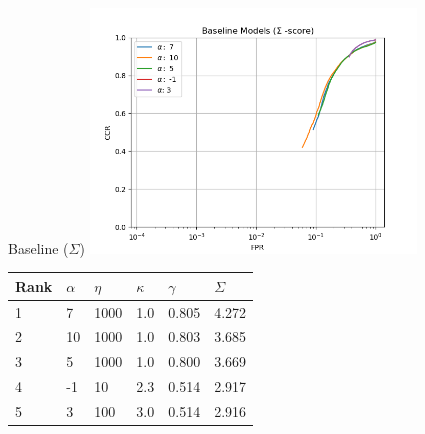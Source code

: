 \begin{frame}{Baseline ($\Sigma$)}
	\centering
	\includegraphics[width=0.65\textwidth]{figures/base_sigma.png}
	\footnotesize{	\begin{tabularx}{\textwidth}{ |X|X|X|X|X|X| }
			\hline
			Rank & $\alpha$ & $\eta$ & $\kappa$ & $\gamma$ & $\Sigma$ \\
			\hline
			1    & 7        & 1000   & 1.0      & 0.805    & 4.272    \\
			2    & 10       & 1000   & 1.0      & 0.803    & 3.685    \\
			3    & 5        & 1000   & 1.0      & 0.800    & 3.669    \\
			4    & -1       & 10     & 2.3      & 0.514    & 2.917    \\
			5    & 3        & 100    & 3.0      & 0.514    & 2.916    \\
			\hline
		\end{tabularx}
	}
\end{frame}

